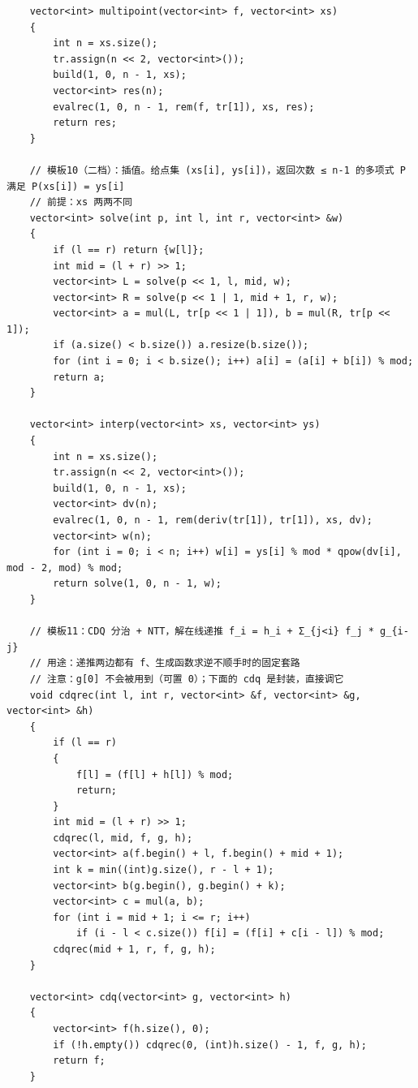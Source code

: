 \documentclass[11pt,a4paper]{ctexart}
\begin{document}
\begin{lstlisting}
    vector<int> multipoint(vector<int> f, vector<int> xs)
    {
        int n = xs.size();
        tr.assign(n << 2, vector<int>());
        build(1, 0, n - 1, xs);
        vector<int> res(n);
        evalrec(1, 0, n - 1, rem(f, tr[1]), xs, res);
        return res;
    }

    // 模板10（二档）：插值。给点集 (xs[i], ys[i])，返回次数 ≤ n-1 的多项式 P 满足 P(xs[i]) = ys[i]
    // 前提：xs 两两不同
    vector<int> solve(int p, int l, int r, vector<int> &w)
    {
        if (l == r) return {w[l]};
        int mid = (l + r) >> 1;
        vector<int> L = solve(p << 1, l, mid, w);
        vector<int> R = solve(p << 1 | 1, mid + 1, r, w);
        vector<int> a = mul(L, tr[p << 1 | 1]), b = mul(R, tr[p << 1]);
        if (a.size() < b.size()) a.resize(b.size());
        for (int i = 0; i < b.size(); i++) a[i] = (a[i] + b[i]) % mod;
        return a;
    }

    vector<int> interp(vector<int> xs, vector<int> ys)
    {
        int n = xs.size();
        tr.assign(n << 2, vector<int>());
        build(1, 0, n - 1, xs);
        vector<int> dv(n);
        evalrec(1, 0, n - 1, rem(deriv(tr[1]), tr[1]), xs, dv);
        vector<int> w(n);
        for (int i = 0; i < n; i++) w[i] = ys[i] % mod * qpow(dv[i], mod - 2, mod) % mod;
        return solve(1, 0, n - 1, w);
    }

    // 模板11：CDQ 分治 + NTT，解在线递推 f_i = h_i + Σ_{j<i} f_j * g_{i-j}
    // 用途：递推两边都有 f、生成函数求逆不顺手时的固定套路
    // 注意：g[0] 不会被用到（可置 0）；下面的 cdq 是封装，直接调它
    void cdqrec(int l, int r, vector<int> &f, vector<int> &g, vector<int> &h)
    {
        if (l == r)
        {
            f[l] = (f[l] + h[l]) % mod;
            return;
        }
        int mid = (l + r) >> 1;
        cdqrec(l, mid, f, g, h);
        vector<int> a(f.begin() + l, f.begin() + mid + 1);
        int k = min((int)g.size(), r - l + 1);
        vector<int> b(g.begin(), g.begin() + k);
        vector<int> c = mul(a, b);
        for (int i = mid + 1; i <= r; i++)
            if (i - l < c.size()) f[i] = (f[i] + c[i - l]) % mod;
        cdqrec(mid + 1, r, f, g, h);
    }

    vector<int> cdq(vector<int> g, vector<int> h)
    {
        vector<int> f(h.size(), 0);
        if (!h.empty()) cdqrec(0, (int)h.size() - 1, f, g, h);
        return f;
    }


\end{lstlisting}
\end{document}
